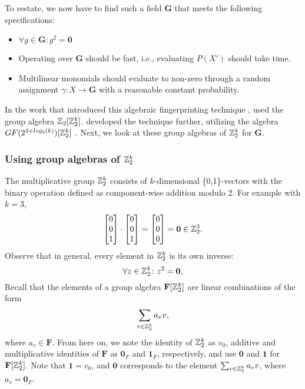 To restate, we now have to find such a field $\mathbf{G}$ that 
meets the following specifications: 
\begin{itemize}
  \item $\forall g \in \mathbf{G} \colon g^2 = \mathbf{0}$
  \item Operating over $\mathbf{G}$ should be fast, i.e., evaluating 
  $P(X')$ should take  time.
  \item Multilinear monomials should evaluate to non-zero
  through a random assignment 
  $\gamma \colon X \to \mathbf{G}$ with a reasonable constant probability.
\end{itemize}

In the work that introduced 
this algebraic fingerprinting technique \cite{Koutis08}, 
\citeauthor{Koutis08} used the group algebra $\mathbb Z_2[\mathbb Z_2^k]$. 
\citeauthor{Williams09} developed the technique further, 
utilizing the algebra $GF(2^{3+log_2(k)})[\mathbb Z_2^k]$ \cite{Williams09}. 
Next, we look at these 
group algebras of $\mathbb Z_2^k$ for $\mathbf{G}$. 

\subsubsection{Using group algebras of $\mathbb Z_2^k$}

The multiplicative group $\mathbb Z_2^k$ consists of $k$-dimensional \{0,1\}-vectors 
with the binary operation defined as component-wise addition modulo 2. 
For example with $k = 3$, 
\[
  \begin{bmatrix} 0 \\ 0 \\ 1 \end{bmatrix} \cdot 
  \begin{bmatrix} 0 \\ 0 \\ 1 \end{bmatrix} =
  \begin{bmatrix} 0 \\ 0 \\ 0 \end{bmatrix} = \mathbf{0} \in \mathbb Z_2^3.
\]
Observe that in general, every element in $\mathbb Z_2^k$ is its own inverse:
\begin{equation}
  \label{eq:Z_2^k has char 2}
  \forall z \in \mathbb Z_2^k \colon z^2 = \mathbf{0}.
\end{equation}
Recall that the elements of a group algebra $\mathbf{F}[\mathbb Z_2^k]$ are linear combinations of the form 
\[
  \displaystyle \sum_{v \in \mathbb Z_2^k}a_v v,
\]
where $a_v \in \mathbf{F}$. From here on, we note the identity of $\mathbb Z_2^k$ as $v_0$, additive and 
multiplicative identities of $\mathbf{F}$ as $\mathbf{0}_F$ and $\mathbf{1}_F$, respectively, and 
use $\mathbf{0}$ and $\mathbf{1}$ for $\mathbf{F}[\mathbb Z_2^k]$. Note that $\mathbf{1} = v_0$, and
$\mathbf{0}$ corresponds to the element $\sum_{v \in \mathbb Z_2^k}a_v v$, where $a_v = \mathbf{0}_F$.

